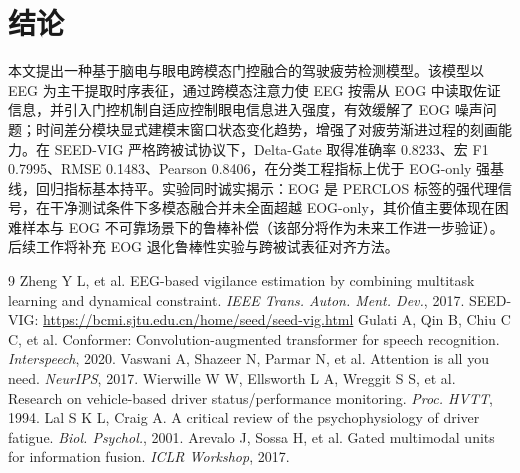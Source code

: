 \documentclass[11pt,a4paper]{ctexart}
\begin{document}
\section{结论}

本文提出一种基于脑电与眼电跨模态门控融合的驾驶疲劳检测模型。该模型以 EEG 为主干提取时序表征，通过跨模态注意力使 EEG 按需从 EOG 中读取佐证信息，并引入门控机制自适应控制眼电信息进入强度，有效缓解了 EOG 噪声问题；时间差分模块显式建模末窗口状态变化趋势，增强了对疲劳渐进过程的刻画能力。在 SEED-VIG 严格跨被试协议下，Delta-Gate 取得准确率 0.8233、宏 F1 0.7995、RMSE 0.1483、Pearson 0.8406，在分类工程指标上优于 EOG-only 强基线，回归指标基本持平。实验同时诚实揭示：EOG 是 PERCLOS 标签的强代理信号，在干净测试条件下多模态融合并未全面超越 EOG-only，其价值主要体现在困难样本与 EOG 不可靠场景下的鲁棒补偿（该部分将作为未来工作进一步验证）。后续工作将补充 EOG 退化鲁棒性实验与跨被试表征对齐方法。

\begin{thebibliography}{9}
 Zheng Y L, et al. EEG-based vigilance estimation by combining multitask learning and dynamical constraint. \textit{IEEE Trans. Auton. Ment. Dev.}, 2017. SEED-VIG: \url{https://bcmi.sjtu.edu.cn/home/seed/seed-vig.html}
 Gulati A, Qin B, Chiu C C, et al. Conformer: Convolution-augmented transformer for speech recognition. \textit{Interspeech}, 2020.
 Vaswani A, Shazeer N, Parmar N, et al. Attention is all you need. \textit{NeurIPS}, 2017.
 Wierwille W W, Ellsworth L A, Wreggit S S, et al. Research on vehicle-based driver status/performance monitoring. \textit{Proc. HVTT}, 1994.
 Lal S K L, Craig A. A critical review of the psychophysiology of driver fatigue. \textit{Biol. Psychol.}, 2001.
 Arevalo J, Sossa H, et al. Gated multimodal units for information fusion. \textit{ICLR Workshop}, 2017.
\end{thebibliography}
\end{document}
